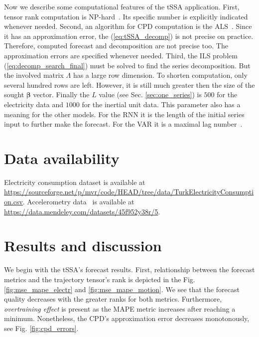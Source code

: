 \documentclass[referee, pdflatex, sn-mathphys-num]{sn-jnl}
\theoremstyle{definition}
\theoremstyle{plain}
\begin{document}
	Now we describe some computational features of the tSSA application. First, tensor rank computation is NP-hard~\cite{HASTAD1990644}. Its specific number is explicitly indicated whenever needed. Second, an algorithm for CPD computation is the ALS~\cite{kolda_tensors}. Since it has an approximation error, the (\ref{eq:tSSA_decomp}) is not precise on practice. Therefore, computed forecast and decomposition are not precise too. The approximation errors are specified whenever needed. Third, the ILS problem (\ref{eq:decomp_search_final}) must be solved to find the series decomposition. But the involved matrix $ \Lambda $ has a large row dimension. To shorten computation, only several hundred rows are left. However, it is still much greater then the size of the sought $ \boldsymbol{\beta} $ vector.	Finally the $ L $ value (see Sec. \ref{sec:one_series}) is $ 500 $ for the electricity data and $ 1000 $ for the inertial unit data. This parameter also has a meaning for the other models. For the RNN it is the length of the initial series input to further make the forecast. For the VAR it is a maximal lag number~\cite{3b1355aedd1041f1853e609a410576f3}. 
	
	\section{Data availability}
	
	Electricity consumption dataset is available at \url{https://sourceforge.net/p/mvr/code/HEAD/tree/data/TurkElectricityConsumption.csv}. Accelerometry data~\cite{accelerometryData} is available at \url{https://data.mendeley.com/datasets/45f952y38r/5}.
	
	\section{Results and discussion}
	
	We begin with the tSSA's forecast results. First, relationship between the forecast metrics and the trajectory tensor's rank is depicted in the Fig. \ref{fig:mse_mape_electr} and \ref{fig:mse_mape_motion}. We see that the forecast quality decreases with the greater ranks for both metrics. Furthermore, \emph{overtraining effect} is present as the MAPE metric increases after reaching a minimum. Nonetheless, the CPD's approximation error decreases monotonously, see Fig. \ref{fig:cpd_errors}.
	
\end{document}
